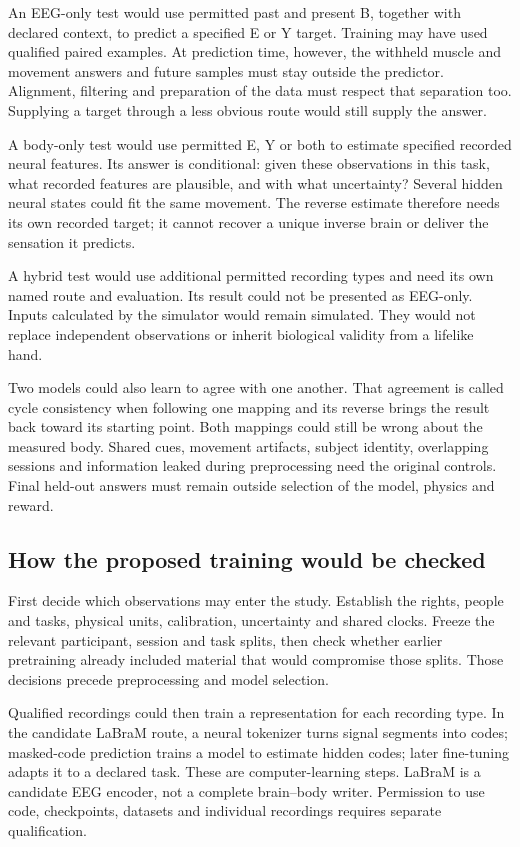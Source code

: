 An EEG-only test would use permitted past and present B, together with
declared context, to predict a specified E or Y target. Training may have
used qualified paired examples. At prediction time, however, the withheld
muscle and movement answers and future samples must stay outside the
predictor. Alignment, filtering and preparation of the data must respect
that separation too. Supplying a target through a less obvious route would
still supply the answer.

A body-only test would use permitted E, Y or both to estimate specified
recorded neural features. Its answer is conditional: given these observations
in this task, what recorded features are plausible, and with what uncertainty?
Several hidden neural states could fit the same movement. The reverse
estimate therefore needs its own recorded target; it cannot recover a unique
inverse brain or deliver the sensation it predicts.

A hybrid test would use additional permitted recording types and need its
own named route and evaluation. Its result could not be presented as EEG-only.
Inputs calculated by the simulator would remain simulated. They would not
replace independent observations or inherit biological validity from a
lifelike hand.

Two models could also learn to agree with one another. That agreement is
called cycle consistency when following one mapping and its reverse brings
the result back toward its starting point. Both mappings could still be
wrong about the measured body. Shared cues, movement artifacts, subject
identity, overlapping sessions and information leaked during preprocessing
need the original controls. Final held-out answers must remain outside
selection of the model, physics and reward.

\subsection{How the proposed training would be checked}

First decide which observations may enter the study. Establish the rights,
people and tasks, physical units, calibration, uncertainty and shared clocks.
Freeze the relevant participant, session and task splits, then check whether
earlier pretraining already included material that would compromise those
splits. Those decisions precede preprocessing and model selection.

Qualified recordings could then train a representation for each recording
type. In the candidate LaBraM route, a neural tokenizer turns signal segments
into codes; masked-code prediction trains a model to estimate hidden codes;
later fine-tuning adapts it to a declared task. These are computer-learning
steps. LaBraM is a candidate EEG encoder, not a complete brain--body writer.
Permission to use code, checkpoints, datasets and individual recordings
requires separate qualification.

